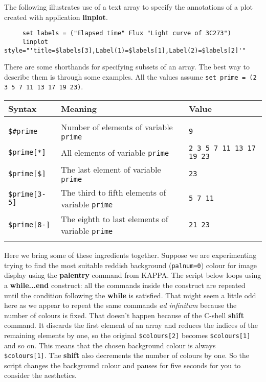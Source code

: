 \documentclass[twoside,11pt]{article}
\newcommand{\xref}[3]{#1}
\newcommand{\KAPPAref}{\xref{{\footnotesize KAPPA}}{sun95}{}}
\begin{document}
The following illustrates use of a text array to specify the
annotations of a plot created with application 
\xref{{\bf linplot}}{sun95}{LINPLOT}.
\small
\begin{verbatim}
     set labels = ("Elapsed time" Flux "Light curve of 3C273")
     linplot style="'title=$labels[3],Label(1)=$labels[1],Label(2)=$labels[2]'"
\end{verbatim}
\normalsize

\medskip
There are some shorthands for specifying subsets of an array.  The best
way to describe them is through some examples.  
All the values assume {\tt set prime = (2 3 5 7 11 13 17 19 23)}.

\begin{center}
\begin{tabular}{lp{80mm}l}
Syntax            & Meaning                    & Value \\ \hline
\\
{\tt \$\#prime}   & Number of elements of variable {\tt prime} & {\tt 9} \\
{\tt \$prime[*]}  & All elements of variable {\tt prime} & {\tt 2 3 5 7 11 13
                                                           17 19 23} \\
{\tt \$prime[\$]} & The last element of variable {\tt prime} & {\tt 23} \\
{\tt \$prime[3-5]} & The third to fifth elements of variable {\tt prime} &
                                                           {\tt 5 7 11} \\
{\tt \$prime[8-]} & The eighth to last elements of variable {\tt prime} &
                                                           {\tt 21 23} \\
\\ \hline
\end{tabular}
\end{center}
\bigskip

Here we bring some of these ingredients together.  Suppose we are
experimenting trying to find the most suitable reddish background
({\tt{palnum=0}}) colour for image display using the 
\xref{{\bf palentry}}{sun95}{PALENTRY} command
from \KAPPAref\@.  The script below loops using a {\bf while...end}
construct: all the commands inside the construct are repeated until the
condition following the {\bf while} is satisfied.  That might seem a
little odd here as we appear to repeat the same commands {\em ad
infinitum} because the number of colours is fixed.  That doesn't happen
because of the C-shell {\bf shift} command.  It discards the first
element of an array and reduces the indices of the remaining elements by
one, so the original {\tt \$colours[2]} becomes {\tt \$colours[1]} and
so on.  This means that the chosen background colour is always {\tt
\$colours[1]}.  The {\bf shift} also decrements the number of colours by
one.  So the script changes the background colour and pauses for five
seconds for you to consider the aesthetics.
\end{document}
